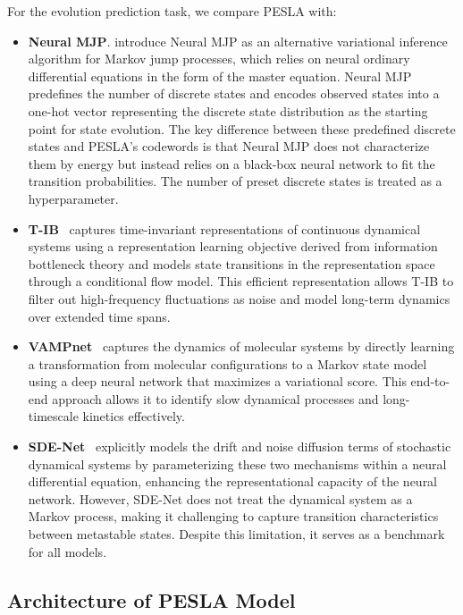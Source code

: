 For the evolution prediction task, we compare PESLA with:
\begin{itemize}
    \item \textbf{Neural MJP}. \citet{seifner2023neural} introduce Neural MJP as an alternative variational inference algorithm for Markov jump processes, which relies on neural ordinary differential equations in the form of the master equation. Neural MJP predefines the number of discrete states and encodes observed states into a one-hot vector representing the discrete state distribution as the starting point for state evolution. The key difference between these predefined discrete states and PESLA's codewords is that Neural MJP does not characterize them by energy but instead relies on a black-box neural network to fit the transition probabilities. The number of preset discrete states is treated as a hyperparameter.
    
    \item \textbf{T-IB}~\citep{federicilatent} captures time-invariant representations of continuous dynamical systems using a representation learning objective derived from information bottleneck theory and models state transitions in the representation space through a conditional flow model. This efficient representation allows T-IB to filter out high-frequency fluctuations as noise and model long-term dynamics over extended time spans.
    
    \item \textbf{VAMPnet}~\citep{mardt2018vampnets} captures the dynamics of molecular systems by directly learning a transformation from molecular configurations to a Markov state model using a deep neural network that maximizes a variational score. This end-to-end approach allows it to identify slow dynamical processes and long-timescale kinetics effectively.
    
    \item \textbf{SDE-Net}~\citep{kong2020sde} explicitly models the drift and noise diffusion terms of stochastic dynamical systems by parameterizing these two mechanisms within a neural differential equation, enhancing the representational capacity of the neural network. However, SDE-Net does not treat the dynamical system as a Markov process, making it challenging to capture transition characteristics between metastable states. Despite this limitation, it serves as a benchmark for all models.
\end{itemize}


\subsection{Architecture of PESLA Model} \label{sec:architecture}

